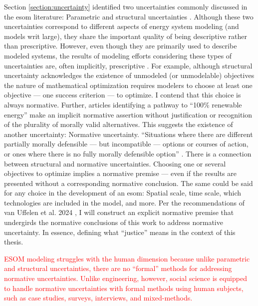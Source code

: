 Section \ref{section:uncertainty} identified two uncertainties commonly
discussed in the \ac{esom} literature: Parametric and structural uncertainties
\cite{decarolis_using_2011}. Although these two uncertainties correspond to
different aspects of energy system modeling (and models writ large), they share
the important quality of being descriptive rather than prescriptive. However,
even though they are primarily used to describe modeled systems, the results of
modeling efforts considering these types of uncertainties are, often implicitly,
prescriptive
\cite{yue_least_2020,decarolis_nc_2018,cochran_la100_2021,bussar_optimal_2014}.
For example, although structural uncertainty acknowledges the existence of
unmodeled (or unmodelable) objectives the nature of mathematical optimization
requires modelers to choose at least one objective --- one success criterion ---
to optimize. I contend that this choice is always normative. Further, articles
identifying a pathway to ``100\% renewable energy'' make an implicit normative
assertion without justification or recognition of the plurality of morally valid
alternatives. This suggests the existence of another uncertainty: Normative
uncertainty. ``Situations where there are different partially morally defensible
--- but incompatible --- options or courses of action, or ones where there is no
fully morally defensible option''
\cite{taebi_bridging_2017,van_uffelen_revisiting_2024}. There is a connection
between structural and normative uncertainties. Choosing one or several
objectives to optimize implies a normative premise --- even if the results are
presented without a corresponding normative conclusion. The same could be said
for any choice in the development of an \ac{esom}: Spatial scale, time scale,
which technologies are included in the model, and more. Per the recommendations
of van Uffelen et al. 2024 \cite{van_uffelen_revisiting_2024}, I will construct
an explicit normative premise that undergirds the normative conclusions of this
work to address normative uncertainty. In essence, defining what ``justice''
means in the context of this thesis. 

\textcolor{red}{ESOM modeling struggles with the human dimension \cite{pfenninger_energy_2014} because
unlike parametric and structural uncertainties, there are no ``formal'' methods for addressing
normative uncertainties. Unlike engineering, however, social science is equipped to handle 
normative uncertainties with formal methods using human subjects, such as case studies, surveys,
interviews, and mixed-methods.}


